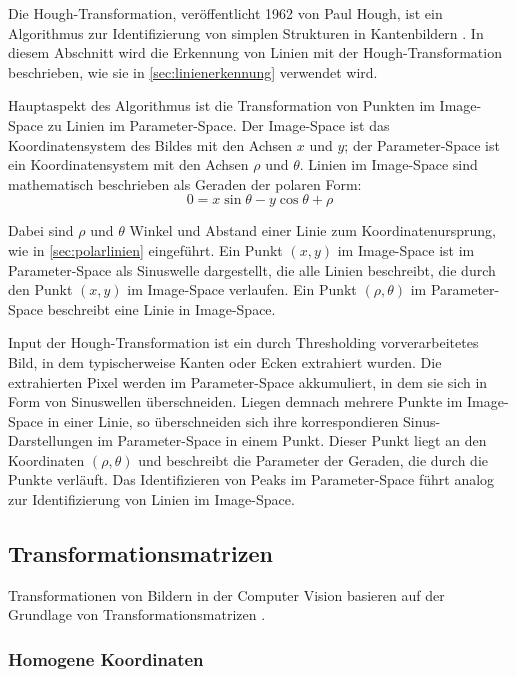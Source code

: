 Die Hough-Transformation, veröffentlicht 1962 von Paul Hough, ist ein Algorithmus zur Identifizierung von simplen Strukturen in Kantenbildern \cite{hough_transform}. In diesem Abschnitt wird die Erkennung von Linien mit der Hough-Transformation beschrieben, wie sie in \autoref{sec:linienerkennung} verwendet wird.

Hauptaspekt des Algorithmus ist die Transformation von Punkten im Image-Space zu Linien im Parameter-Space. Der Image-Space ist das Koordinatensystem des Bildes mit den Achsen $x$ und $y$; der Parameter-Space ist ein Koordinatensystem mit den Achsen $\rho$ und $\theta$. Linien im Image-Space sind mathematisch beschrieben als Geraden der polaren Form:
\[ 0 = x \sin{\theta} - y \cos{\theta} + \rho \]

Dabei sind $\rho$ und $\theta$ Winkel und Abstand einer Linie zum Koordinatenursprung, wie in \autoref{sec:polarlinien} eingeführt. Ein Punkt $(x, y)$ im Image-Space ist im Parameter-Space als Sinuswelle dargestellt, die alle Linien beschreibt, die durch den Punkt $(x, y)$ im Image-Space verlaufen. Ein Punkt $(\rho, \theta)$ im Parameter-Space beschreibt eine Linie in Image-Space.

Input der Hough-Transformation ist ein durch Thresholding vorverarbeitetes Bild, in dem typischerweise Kanten oder Ecken extrahiert wurden. Die extrahierten Pixel werden im Parameter-Space akkumuliert, in dem sie sich in Form von Sinuswellen überschneiden. Liegen demnach mehrere Punkte im Image-Space in einer Linie, so überschneiden sich ihre korrespondieren Sinus-Darstellungen im Parameter-Space in einem Punkt. Dieser Punkt liegt an den Koordinaten $(\rho, \theta)$ und beschreibt die Parameter der Geraden, die durch die Punkte verläuft. Das Identifizieren von Peaks im Parameter-Space führt analog zur Identifizierung von Linien im Image-Space.

\subsection{Transformationsmatrizen}
\label{sec:transformations_matrizen}

Transformationen von Bildern in der Computer Vision basieren auf der Grundlage von Transformationsmatrizen \cite{transformationen_1} \cite{transformationen_2}.

\subsubsection{Homogene Koordinaten}
\label{sec:homogene_koordinaten}

